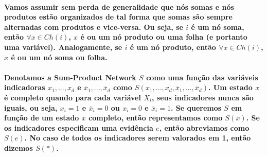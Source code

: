 \documentclass[a4paper,10pt]{article}
\theoremstyle{plain}
\begin{document}
\begin{figure}[h]
\end{figure}

\paragraph{
  Vamos assumir sem perda de generalidade que nós somas e nós produtos estão organizados de tal
  forma que somas são sempre alternadas com produtos e vice-versa. Ou seja, se $i$ é um nó soma,
  então $\forall x \in Ch(i)$, $x$ é ou um nó produto ou uma folha (e portanto uma variável).
  Analogamente, se $i$ é um nó produto, então $\forall x \in Ch(i)$, $x$ é ou um nó soma ou folha.
}

\paragraph{
  Denotamos a Sum-Product Network $S$ como uma função das variáveis indicadoras $x_1,...,x_d$ e
  $\overline{x}_1,...,\overline{x}_d$ como $S(x_1,...,x_d,\overline{x}_1,...,\overline{x}_d)$. Um
  estado $x$ é completo quando para cada variável $X_i$, seus indicadores nunca são iguais, ou
  seja, $x_i=1$ e $\overline{x}_i=0$ ou $x_i=0$ e $\overline{x}_i=1$. Se queremos $S$ em função
  de um estado $x$ completo, então representamos como $S(x)$. Se os indicadores especificam uma
  evidência\cite{project-def} $e$, então abreviamos como $S(e)$. No caso de todos os indicadores
  serem valorados em 1, então dizemos $S(*)$.
}
\end{document}
